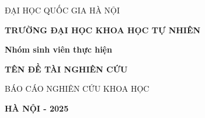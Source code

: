 \begin{titlepage}
\thispagestyle{empty}
\thisfancypage{
    \setlength{\fboxrule}{2pt}
\doublebox}{}
\fontsize{15pt}{10pt}\selectfont
\centerline{{ {ĐẠI HỌC QUỐC GIA HÀ NỘI}}}
\centerline{ \bf {TRƯỜNG ĐẠI HỌC KHOA HỌC TỰ NHIÊN}}
\vspace*{3cm}
\centerline{
\textbf{Nhóm sinh viên thực hiện}
}
\vspace*{4cm}
\centerline{ \bf {TÊN ĐỀ TÀI NGHIÊN CỨU}}
\vspace*{3cm}

\centerline{ BÁO CÁO NGHIÊN CỨU KHOA HỌC}
\vspace*{2cm}
\vfill
\centerline{\bf HÀ NỘI - 2025}
\vspace*{0.5cm}
\end{titlepage}